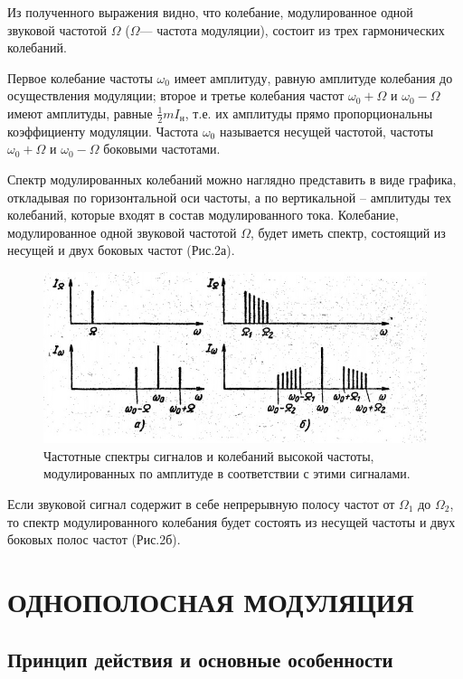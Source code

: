 Из полученного выражения видно, что колебание, модулированное одной звуковой частотой $\Omega$ ($\Omega$— частота модуляции), состоит из трех гармонических колебаний.

Первое колебание частоты $\omega_0$ имеет амплитуду, равную амплитуде колебания до осуществления модуляции; второе и третье колебания частот $\omega_0+\Omega$ и $\omega_0-\Omega$ имеют амплитуды, равные $\frac12mI_{\text{н}}$, т.е. их амплитуды прямо пропорциональны коэффициенту модуляции. Частота $\omega_0$ называется несущей частотой, частоты $\omega_0+\Omega$ и $\omega_0-\Omega$ боковыми частотами.

Спектр модулированных колебаний можно наглядно представить в виде графика, откладывая по горизонтальной оси частоты, а по вертикальной – амплитуды тех колебаний, которые входят в состав модулированного тока. Колебание, модулированное одной звуковой частотой $\Omega$, будет иметь спектр, состоящий из несущей и двух боковых частот (Рис.2а).

\begin{figure}[h!]
	\centering
	\includegraphics[scale=1.5]{fig/fig2}
	\caption{ Частотные спектры сигналов и колебаний высокой частоты,
	модулированных по амплитуде в соответствии с этими сигналами.}
	\label{fig:fig2}
\end{figure}

Если звуковой сигнал содержит в себе непрерывную полосу частот от $\Omega_1$ до $\Omega_2$, то спектр модулированного колебания будет состоять из несущей частоты и двух боковых полос частот (Рис.2б).

\section{ОДНОПОЛОСНАЯ МОДУЛЯЦИЯ}
\subsection{Принцип действия и основные особенности}

